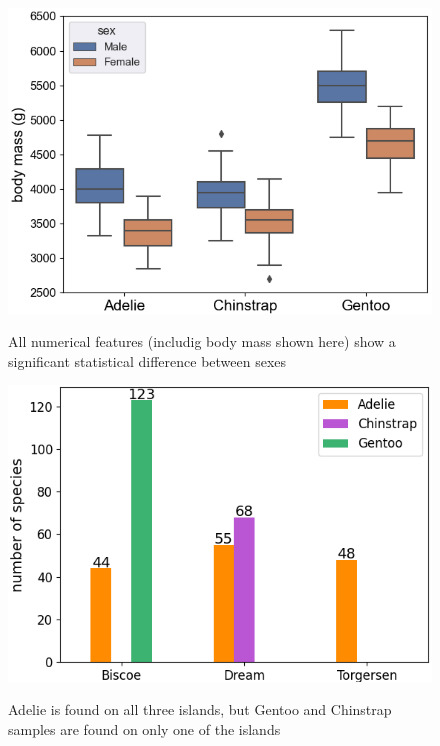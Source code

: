 \documentclass[a4paper, 11pt]{article}
\begin{document}
\begin{figure}[!ht]
  \vspace{-0.5\baselineskip} %
  \begin{minipage}{0.48\textwidth}
    \vspace{0\baselineskip} %
    \centering
    \includegraphics[width=1\textwidth]{sex.png} %
    \vspace{-1.5\baselineskip} %
    \caption{All numerical features (includig body mass shown here) show a significant statistical difference between sexes}
    \vspace{-1\baselineskip} %
    \label{fig:sex}
  \end{minipage}\hfill
  \begin{minipage}{0.48\textwidth}
    \vspace{0\baselineskip} %
    \centering
    \includegraphics[width=1\textwidth]{islands.png} %
    \vspace{-1.5\baselineskip} %
    \caption{Adelie is found on all three islands, but Gentoo and Chinstrap samples are found on only one of the islands}
    \vspace{-1\baselineskip} %
    \label{fig:islands}
  \end{minipage}
\end{figure}
\end{document}
